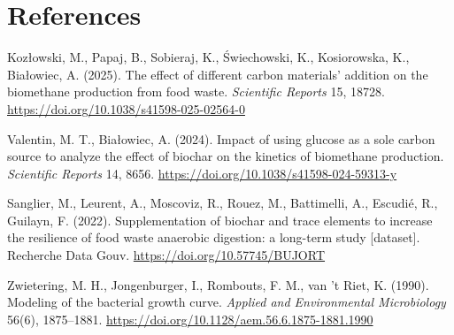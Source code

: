 \documentclass[10pt,a4paper]{article}
\begin{document}
\section*{References}
\small
\begin{enumerate}[label={[\arabic*]},leftmargin=2em]
\item Koz\l{}owski, M., Papaj, B., Sobieraj, K., \'Swiechowski, K., Kosiorowska, K., Bia\l{}owiec, A. (2025). The effect of different carbon materials' addition on the biomethane production from food waste. \emph{Scientific Reports} 15, 18728. \url{https://doi.org/10.1038/s41598-025-02564-0}
\item Valentin, M. T., Bia\l{}owiec, A. (2024). Impact of using glucose as a sole carbon source to analyze the effect of biochar on the kinetics of biomethane production. \emph{Scientific Reports} 14, 8656. \url{https://doi.org/10.1038/s41598-024-59313-y}
\item Sanglier, M., Leurent, A., Moscoviz, R., Rouez, M., Battimelli, A., Escudi\'e, R., Guilayn, F. (2022). Supplementation of biochar and trace elements to increase the resilience of food waste anaerobic digestion: a long-term study [dataset]. Recherche Data Gouv. \url{https://doi.org/10.57745/BUJORT}
\item Zwietering, M. H., Jongenburger, I., Rombouts, F. M., van 't Riet, K. (1990). Modeling of the bacterial growth curve. \emph{Applied and Environmental Microbiology} 56(6), 1875--1881. \url{https://doi.org/10.1128/aem.56.6.1875-1881.1990}
\end{enumerate}
\end{document}
